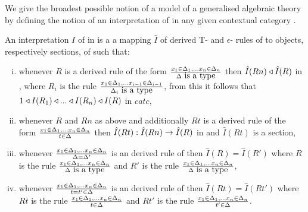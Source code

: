 \newcommand{\gatdisplayrule}[2]
{
\setlength{\fboxsep}{1pt}
\setlength{\fboxrule}{0pt}
\fbox{$\displaystyle \frac{#1}{#2}$}
}
\newcommand{\Isort}{I_{sort}}
\newcommand{\Iop}{I_{op}}
\newcommand {\Ihat}{\hat{I}}

\renewcommand{\crossx}[3]{#1 \underset{\tiny #3}{\cross} #2}
\newcommand{\fonestar}   {{f_1}\kern-.15em^*}
\newcommand{\ftwostar}   {{f_2}\kern-.15em^*}
\newcommand{\fjstar}     {{f_j}\kern-.2em^*}
\newcommand{\fjpstar}    {{f_{j-1}}\kern-.25em^*}
\newcommand{\smstar}{{s_m}\kern-.25em^*}
\newcommand{\sonestar}{{s_1}\kern-.15em^*}

\note
We give the broadest possible notion of a model
of a generalised algebraic theory \gatUw by defining the notion of an interpretation of  \gatUw in  any given contextual category \catc.

\note 
An interpretation $I$ of \gatUw in \catcw is a  a mapping $\hat{I}$
of derived T- and $\epsilon$- rules of \gatUw to objects, respectively sections, of \gatUw such that:


\begin{enumerate}[(i)]
\setlength\itemindent{2cm}
\item whenever $R$ is a derived rule of the form $\frac{x_1 \in \Delta_1,... x_{n} \in \Delta_{n}}{\Delta\mbox{ is a type}}$
then $\Ihat(Rn) \base \Ihat(R)$ in \catc, where $R_i$ is the rule
$\frac{x_1 \in \Delta_1,... x_{i-1} \in \Delta_{i-1}}{\Delta_i\mbox{ is a type}}$, from this it follows that $1 \triangleleft I(R_1) \triangleleft ... \triangleleft I(R_n) \triangleleft I(R)$ in $catc$,

\item whenever $R$ and $Rn$ as above and additionally $Rt$ is a derived rule of the form $\frac{x_1 \in \Delta_1,... x_{n} \in \Delta_{n}}{t \in \Delta}$
then $\Ihat(Rt) : \Ihat(Rn) \morph \Ihat(R)$  in \catcw and $\Ihat(Rt)$ is a section, 

\item whenever
$\frac{x_1 \in \Delta_1,... x_{n} \in \Delta_{n}}{\Delta = \Delta'}$
is an derived rule of \gatU then $\Ihat(R) = \Ihat(R')$
where $R$ is the rule
$\frac{x_1 \in \Delta_1,... x_{n} \in \Delta_{n}}{\Delta\mbox{ is a type}}$
and $R'$ is the rule
$\frac{x_1 \in \Delta_1,... x_{n} \in \Delta_{n}}{\Delta\mbox{ is a type}}$,

\item whenever
$\frac{x_1 \in \Delta_1,... x_{n} \in \Delta_{n}}{t = t' \in \Delta}$
is an derived rule of \gatUw then $\Ihat(Rt) = \Ihat(Rt')$
where $Rt$ is the rule
$\frac{x_1 \in \Delta_1,... x_{n} \in \Delta_{n}}{t \in \Delta}$
and $Rt'$ is the rule
$\frac{x_1 \in \Delta_1,... x_{n} \in \Delta_{n}}{t' \in \Delta}$.
\end{enumerate}

